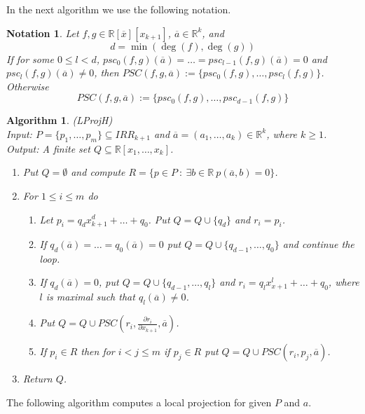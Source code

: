 \documentclass[english]{amsart}
\numberwithin{equation}{section}
\numberwithin{figure}{section}
\newtheorem{notation}[thm]{Notation}
\newtheorem{algorithm}[thm]{Algorithm}
\begin{document}
In the next algorithm we use the following notation.
\begin{notation}
Let $f,g\in\mathbb{R}[\overline{x}][x_{k+1}]$, $\overline{a}\in\mathbb{R}^{k}$,
and \[
d=\min(\deg(f),\deg(g))\]
If for some $0\leq l<d$, $psc_{0}(f,g)(\overline{a})=\ldots=psc_{l-1}(f,g)(\overline{a})=0$
and $psc_{l}(f,g)(\overline{a})\neq0$, then $PSC(f,g,\overline{a}):=\{psc_{0}(f,g),\ldots,psc_{l}(f,g)\}$.
Otherwise \[
PSC(f,g,\overline{a}):=\{psc_{0}(f,g),\ldots,psc_{d-1}(f,g)\}\]
\end{notation}
\begin{algorithm}
\label{alg:LProjH}(LProjH)\\
Input:\emph{ }$P=\{p_{1},\ldots,p_{m}\}\subseteq IRR_{k+1}$ \emph{and
}$\overline{a}=(a_{1},\ldots,a_{k})\in\mathbb{R}^{k}$\emph{, where
$k\geq1$.}\textup{}\\
\textup{\emph{Output:}}\textup{ A }\emph{finite set }$Q\subseteq\mathbb{R}[x_{1},\ldots,x_{k}]$. 
\begin{enumerate}
\item Put $Q=\emptyset$ and compute $R=\{p\in P\::\:\exists b\in\mathbb{R}\: p(\overline{a},b)=0\}$.
\item For $1\leq i\leq m$ do

\begin{enumerate}
\item Let $p_{i}=q_{d}x_{k+1}^{d}+\ldots+q_{0}$. Put $Q=Q\cup\{q_{d}\}$
and $r_{i}=p_{i}$.
\item If $q_{d}(\overline{a})=\ldots=q_{0}(\overline{a})=0$ put $Q=Q\cup\{q_{d-1},\ldots,q_{0}\}$
and continue the loop.
\item If $q_{d}(\overline{a})=0$, put $Q=Q\cup\{q_{d-1},\ldots,q_{l}\}$
and $r_{i}=q_{l}x_{x+1}^{l}+\ldots+q_{0}$, where $l$ is maximal
such that $q_{l}(\overline{a})\neq0$.
\item Put $Q=Q\cup PSC(r_{i},\frac{\partial r_{i}}{\partial x_{k+1}},\overline{a})$.
\item If $p_{i}\in R$ then for $i<j\leq m$ if $p_{j}\in R$ put $Q=Q\cup PSC(r_{i},p_{j},\overline{a})$.
\end{enumerate}
\item Return $Q$.
\end{enumerate}
\end{algorithm}
The following algorithm computes a local projection for given $P$
and $a$. 
\end{document}
